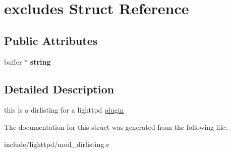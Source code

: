 \hypertarget{structexcludes}{
\section{excludes Struct Reference}
\label{structexcludes}
}
\subsection*{Public Attributes}
\begin{CompactItemize}
\item 
\hypertarget{structexcludes_ad6f3586601eba5c68854a77630abee2}{
buffer $\ast$ \textbf{string}}
\label{structexcludes_ad6f3586601eba5c68854a77630abee2}

\end{CompactItemize}


\subsection{Detailed Description}
this is a dirlisting for a lighttpd \hyperlink{structplugin}{plugin} 

The documentation for this struct was generated from the following file:\begin{CompactItemize}
\item 
include/lighttpd/mod\_\-dirlisting.c\end{CompactItemize}
